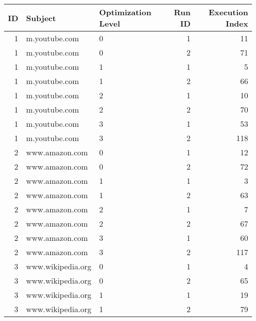 \begin{tabular}{rllrr}
\toprule
 ID &              Subject & Optimization Level &  Run ID &  Execution Index \\
\midrule
  1 &        m.youtube.com &                  0 &       1 &               11 \\
  1 &        m.youtube.com &                  0 &       2 &               71 \\
  1 &        m.youtube.com &                  1 &       1 &                5 \\
  1 &        m.youtube.com &                  1 &       2 &               66 \\
  1 &        m.youtube.com &                  2 &       1 &               10 \\
  1 &        m.youtube.com &                  2 &       2 &               70 \\
  1 &        m.youtube.com &                  3 &       1 &               53 \\
  1 &        m.youtube.com &                  3 &       2 &              118 \\
  2 &       www.amazon.com &                  0 &       1 &               12 \\
  2 &       www.amazon.com &                  0 &       2 &               72 \\
  2 &       www.amazon.com &                  1 &       1 &                3 \\
  2 &       www.amazon.com &                  1 &       2 &               63 \\
  2 &       www.amazon.com &                  2 &       1 &                7 \\
  2 &       www.amazon.com &                  2 &       2 &               67 \\
  2 &       www.amazon.com &                  3 &       1 &               60 \\
  2 &       www.amazon.com &                  3 &       2 &              117 \\
  3 &    www.wikipedia.org &                  0 &       1 &                4 \\
  3 &    www.wikipedia.org &                  0 &       2 &               65 \\
  3 &    www.wikipedia.org &                  1 &       1 &               19 \\
  3 &    www.wikipedia.org &                  1 &       2 &               79 \\

\end{tabular}
